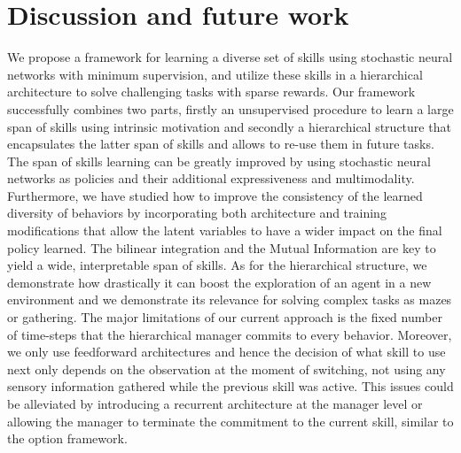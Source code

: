 \documentclass{article} %
\begin{document}
\section{Discussion and future work}
We propose a framework for learning a diverse set of skills using stochastic neural networks with minimum supervision, and utilize these skills in a hierarchical architecture to solve challenging tasks with sparse rewards. Our framework successfully combines two parts, firstly an unsupervised procedure to learn a large span of skills using intrinsic motivation and secondly a hierarchical structure that encapsulates the latter span of skills and allows to re-use them in future tasks. The span of skills learning can be greatly improved by using stochastic neural networks as policies and their additional expressiveness and multimodality. Furthermore, we have studied how to improve the consistency of the learned diversity of behaviors by incorporating both architecture and training modifications that allow the latent variables to have a wider impact on the final policy learned. The bilinear integration and the Mutual Information are key to yield a wide, interpretable span of skills. As for the hierarchical structure, we demonstrate how drastically it can boost the exploration of an agent in a new environment and we demonstrate its relevance for solving complex tasks as mazes or gathering. The major limitations of our current approach is the fixed number of time-steps that the hierarchical manager commits to every behavior. Moreover, we only use feedforward architectures and hence the decision of what skill to use next only depends on the observation at the moment of switching, not using any sensory information gathered while the previous skill was active. This issues could be alleviated by introducing a recurrent architecture at the manager level or allowing the manager to terminate the commitment to the current skill, similar to the option framework.

\end{document}
